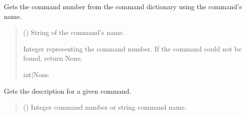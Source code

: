 \documentclass[letterpaper,10pt,english]{sphinxmanual}
\begin{document}
\begin{fulllineitems}
\begin{fulllineitems}
\end{fulllineitems}


\begin{fulllineitems}
\label{\detokenize{PodCommands:PodCommands.POD_Commands.CommandNumberFromName}}
\pysigstartsignatures
{}
\pysigstopsignatures
\sphinxAtStartPar
Gets the command number from the command dictionary using the command’s name.
\begin{quote}\begin{description}
\sphinxAtStartPar
{} () \textendash{} String of the command’s name.

\sphinxAtStartPar
Integer representing the command number. If the command could not be found,                 return None.

\sphinxAtStartPar
int|None

\end{description}\end{quote}

\end{fulllineitems}


\begin{fulllineitems}
\label{\detokenize{PodCommands:PodCommands.POD_Commands.Description}}
\pysigstartsignatures
{}
\pysigstopsignatures
\sphinxAtStartPar
Gets the description for a given command.
\begin{quote}\begin{description}
\sphinxAtStartPar
{} (\sphinxstyleliteralemphasis{\sphinxupquote{ | }}) \textendash{} Integer command number or string command name.


\end{description}
\end{quote}
\end{fulllineitems}
\end{fulllineitems}
\end{document}
